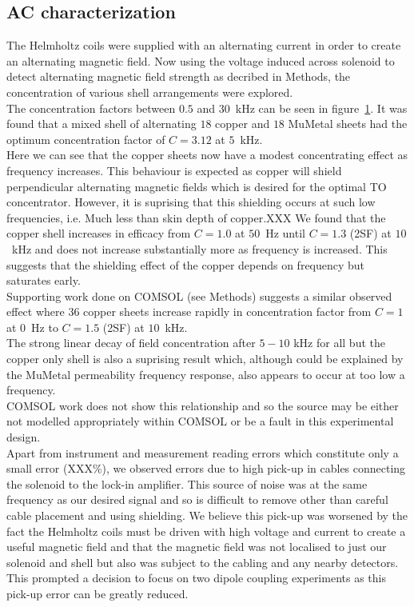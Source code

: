 \documentclass[11pt]{iopart}
\begin{document}
\subsection{AC characterization}
\begin{figure}
  \caption{}
  \label{fig:AC_helm_graph}
\end{figure}

The Helmholtz coils were supplied with an alternating current in order
to create an alternating magnetic field.  Now using the voltage
induced across solenoid to detect alternating magnetic field strength
as decribed in Methods, the concentration of various shell
arrangements were explored.\\

The concentration factors between $0.5$ and $30$~kHz can be seen in
figure~\ref{fig:AC_helm_graph}. It was found that a mixed shell of
alternating $18$ copper and $18$ MuMetal sheets had the optimum
concentration factor of $C = 3.12$ at $5$~kHz.\\ Here we can see that
the copper sheets now have a modest concentrating effect as frequency
increases. This behaviour is expected as copper will shield
perpendicular alternating magnetic fields which is desired for the
optimal TO concentrator. However, it is suprising that this shielding
occurs at such low frequencies, i.e. Much less than skin depth of
copper.XXX
We found that the copper shell increases in efficacy from $C = 1.0$ at
$50$~Hz until $C = 1.3$ (2SF) at $10$~kHz and does not increase
substantially more as frequency is increased. This suggests that the
shielding effect of the copper depends on frequency but saturates
early.\\ Supporting work done on COMSOL (see Methods) suggests a similar observed
effect where 36 copper sheets increase rapidly in concentration factor
from $C = 1$ at $0$~Hz to $C = 1.5$ (2SF) at $10$~kHz.\\

The strong linear decay of field concentration after $5-10$ kHz for
all but the copper only shell is also a suprising result which,
although could be explained by the MuMetal permeability frequency
response, also appears to occur at too low a frequency.\\ COMSOL work
does not show this relationship and so the source may be either not
modelled appropriately within COMSOL or be a fault in this
experimental design.\\

Apart from instrument and measurement reading errors which constitute
only a small error (XXX\%), we observed errors due to high pick-up in
cables connecting the solenoid to the lock-in amplifier. This source
of noise was at the same frequency as our desired signal and so is
difficult to remove other than careful cable placement and using
shielding. We believe this pick-up was worsened by the fact the
Helmholtz coils must be driven with high voltage and current to
create a useful magnetic field and that the magnetic field was not
localised to just our solenoid and shell but also was subject to the
cabling and any nearby detectors. This prompted a decision to focus on
two dipole coupling experiments as this pick-up error can be greatly
reduced.\\
\end{document}
